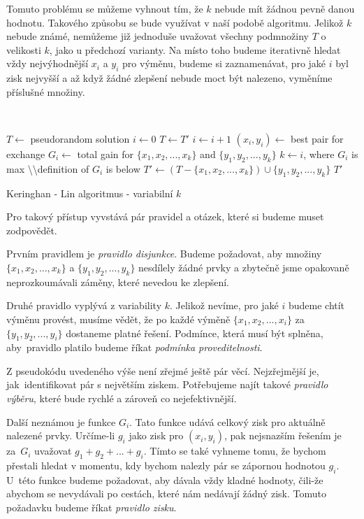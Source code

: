 \documentclass[
  printversion=false,
  joinlists=true,
  glossaries=true,
  figures=true,
  tables=true,
  sourcecodes=false,
  theorems=false,
  bibencoding=utf8,
  language=czech,
  encoding=utf8,
  program=infpvs,
  index=true,
  biblatex=true
]{kidiplom}
\begin{document}
Tomuto problému se můžeme vyhnout tím, že $k$ nebude mít žádnou pevně danou hodnotu. Takového způsobu se bude využívat v naší podobě algoritmu. Jelikož $k$ nebude známé, nemůžeme již jednoduše uvažovat všechny podmnožiny $T$ o velikosti $k$, jako u předchozí varianty. Na místo toho budeme iterativně hledat vždy nejvýhodnější $x_i$ a $y_i$ pro výměnu, budeme si zaznamenávat, pro jaké $i$ byl zisk nejvyšší a až když žádné zlepšení nebude moct být nalezeno, vyměníme příslušné množiny.
\newline

{\LinesNumbered\SetAlgoNoLine\
\begin{algorithm}[H]
%
$T \leftarrow$ pseudorandom solution\;
{
$i \leftarrow 0$\;
$T \leftarrow T'$\;
{
$i \leftarrow i + 1$\;
$(x_i, y_i) \leftarrow$ best pair for exchange\;
$G_i \leftarrow$ total gain for $\{x_1, x_2, ..., x_k\}$ and $\{y_1, y_2, ..., y_k\}$\;
}
$k \leftarrow i$, where $G_i$ is max \textbackslash\textbackslash definition of $G_i$ is below\;
$T' \leftarrow (T - \{x_1, x_2, ..., x_k\}) \cup \{y_1, y_2, ..., y_k\}$\;
}
\Return $T'$\;
\caption{Keringhan - Lin algoritmus - variabilní $k$}
\end{algorithm}
}\leavevmode\newline

\leavevmode\newline\leavevmode\newline
Pro takový přístup vyvstává pár pravidel a otázek, které si budeme muset zodpovědět.

Prvním pravidlem je \textit{pravidlo disjunkce}. Budeme požadovat, aby množiny $\{x_1, x_2, ..., x_k\}$ a $\{y_1, y_2, ..., y_k\}$ nesdílely žádné prvky a zbytečně jsme opakovaně neprozkoumávali záměny, které nevedou ke zlepšení.

Druhé pravidlo vyplývá z variability $k$. Jelikož nevíme, pro jaké $i$ budeme chtít výměnu provést, musíme vědět, že po každé výměně $\{x_1, x_2, ..., x_i\}$ za~$\{y_1, y_2, ..., y_i\}$ dostaneme platné řešení. Podmínce, která musí být splněna, aby~pravidlo platilo budeme říkat \textit{podmínka proveditelnosti}.

Z pseudokódu uvedeného výše není zřejmé ještě pár věcí. Nejzřejmější je, jak~identifikovat pár s největším ziskem. Potřebujeme najít takové \textit{pravidlo výběru}, které bude rychlé a zároveň co nejefektivnější.

Další neznámou je funkce $G_i$. Tato funkce udává celkový zisk pro aktuálně nalezené prvky. Určíme-li $g_i$ jako zisk pro $(x_i, y_i)$, pak nejsnazším řešením je za~$G_i$ uvažovat $g_1 + g_2 + ... + g_i$. Tímto se také vyhneme tomu, že bychom přestali hledat v momentu, kdy bychom nalezly pár se zápornou hodnotou $g_i$. U~této funkce budeme požadovat, aby dávala vždy kladné hodnoty, čili-že abychom se nevydávali po cestách, které nám nedávají žádný zisk. Tomuto požadavku budeme říkat \textit{pravidlo zisku}.
\end{document}

